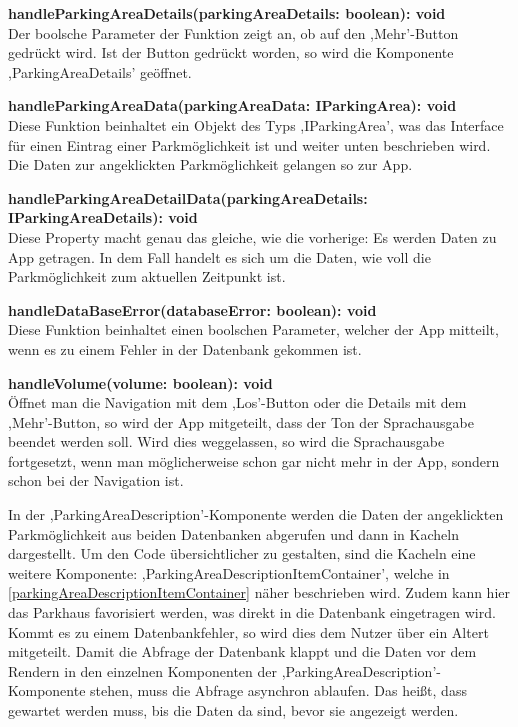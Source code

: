 \begin{description}
	\item \textbf{handleParkingAreaDetails(parkingAreaDetails: boolean): void} \\ Der boolsche Parameter der Funktion zeigt an, ob auf den ,Mehr'-Button gedrückt wird. Ist der Button gedrückt worden, so wird die Komponente ,ParkingAreaDetails' geöffnet.
	\item \textbf{handleParkingAreaData(parkingAreaData: IParkingArea): void} \\ Diese Funktion beinhaltet ein Objekt des Typs ,IParkingArea', was das Interface für einen Eintrag einer Parkmöglichkeit ist und weiter unten beschrieben wird. Die Daten zur angeklickten Parkmöglichkeit gelangen so zur App.
	\item \textbf{handleParkingAreaDetailData(parkingAreaDetails: IParkingAreaDetails): void} \\ Diese Property macht genau das gleiche, wie die vorherige: Es werden Daten zu App getragen. In dem Fall handelt es sich um die Daten, wie voll die Parkmöglichkeit zum aktuellen Zeitpunkt ist.
	\item \textbf{handleDataBaseError(databaseError: boolean): void} \\ Diese Funktion beinhaltet einen boolschen Parameter, welcher der App mitteilt, wenn es zu einem Fehler in der Datenbank gekommen ist.
	\item \textbf{handleVolume(volume: boolean): void} \\ Öffnet man die Navigation mit dem ,Los'-Button oder die Details mit dem ,Mehr'-Button, so wird der App mitgeteilt, dass der Ton der Sprachausgabe beendet werden soll. Wird dies weggelassen, so wird die Sprachausgabe fortgesetzt, wenn man möglicherweise schon gar nicht mehr in der App, sondern schon bei der Navigation ist.
\end{description}

In der ,ParkingAreaDescription'-Komponente werden die Daten der angeklickten Parkmöglichkeit aus beiden Datenbanken abgerufen und dann in Kacheln dargestellt. Um den Code übersichtlicher zu gestalten, sind die Kacheln eine weitere Komponente: ,ParkingAreaDescriptionItemContainer', welche in \autoref{parkingAreaDescriptionItemContainer} näher beschrieben wird. Zudem kann hier das Parkhaus favorisiert werden, was direkt in die Datenbank eingetragen wird. Kommt es zu einem Datenbankfehler, so wird dies dem Nutzer über ein Altert mitgeteilt. Damit die Abfrage der Datenbank klappt und die Daten vor dem Rendern in den einzelnen Komponenten der ,ParkingAreaDescription'-Komponente stehen, muss die Abfrage asynchron ablaufen. Das heißt, dass gewartet werden muss, bis die Daten da sind, bevor sie angezeigt werden.

